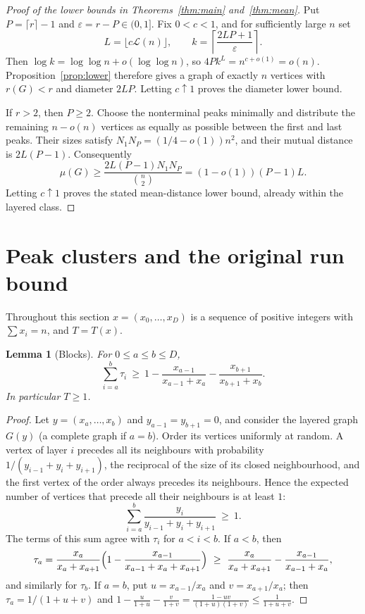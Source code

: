 \documentclass[11pt]{amsart}
\newtheorem{lemma}[theorem]{Lemma}
\theoremstyle{definition}
\theoremstyle{remark}
\newcommand{\Lz}{\mathcal{L}}
\begin{document}
\begin{proof}[Proof of the lower bounds in Theorems~\ref{thm:main} and~\ref{thm:mean}]
Put $P=\lceil r\rceil-1$ and $\varepsilon=r-P\in(0,1]$.
Fix $0<c<1$, and for sufficiently large $n$ set
\[
 L=\lfloor c\Lz(n)\rfloor,
 \qquad k=\left\lceil\frac{2LP+1}{\varepsilon}\right\rceil.
\]
Then $\log k=\log\log n+o(\log\log n)$, so
$4Pk^L=n^{c+o(1)}=o(n)$. Proposition~\ref{prop:lower} therefore gives a
graph of exactly $n$ vertices with $r(G)<r$ and diameter $2LP$.
Letting $c\uparrow1$ proves the diameter lower bound.

If $r>2$, then $P\ge2$. Choose the nonterminal peaks minimally and
distribute the remaining $n-o(n)$ vertices as equally as possible between
the first and last peaks. Their sizes satisfy
$N_1N_P=(1/4-o(1))n^2$, and their mutual distance is $2L(P-1)$.
Consequently
\[
 \mu(G)\ge\frac{2L(P-1)N_1N_P}{\binom n2}
          =(1-o(1))(P-1)L.
\]
Letting $c\uparrow1$ proves the stated mean-distance lower bound, already
within the layered class.
\end{proof}
\section{Peak clusters and the original run bound}\label{sec:clusters}

Throughout this section $x=(x_0,\dots,x_D)$ is a sequence of positive integers with $\sum x_i=n$, and $T=T(x)$.

\begin{lemma}[Blocks]\label{lem:block}
For $0\le a\le b\le D$,
\[
\sum_{i=a}^{b}\tau_i\ \ge\ 1-\frac{x_{a-1}}{x_{a-1}+x_a}-\frac{x_{b+1}}{x_{b+1}+x_b}.
\]
In particular $T\ge1$.
\end{lemma}

\begin{proof}
Let $y=(x_a,\dots,x_b)$ and $y_{a-1}=y_{b+1}=0$, and consider the layered graph $G(y)$ (a complete graph if $a=b$). Order its vertices uniformly at random. A vertex of layer $i$ precedes all its neighbours with probability $1/(y_{i-1}+y_i+y_{i+1})$, the reciprocal of the size of its closed neighbourhood, and the first vertex of the order always precedes its neighbours. Hence the expected number of vertices that precede all their neighbours is at least $1$:
\[
\sum_{i=a}^{b}\frac{y_i}{y_{i-1}+y_i+y_{i+1}}\ \ge\ 1 .
\]
The terms of this sum agree with $\tau_i$ for $a<i<b$.
If $a<b$, then
\[
\tau_a=\frac{x_a}{x_a+x_{a+1}}\Bigl(1-\frac{x_{a-1}}{x_{a-1}+x_a+x_{a+1}}\Bigr)\ \ge\ \frac{x_a}{x_a+x_{a+1}}-\frac{x_{a-1}}{x_{a-1}+x_a},
\]
and similarly for $\tau_b$.
If $a=b$, put $u=x_{a-1}/x_a$ and $v=x_{a+1}/x_a$; then $\tau_a=1/(1+u+v)$ and
$1-\frac u{1+u}-\frac v{1+v}=\frac{1-uv}{(1+u)(1+v)}\le\frac1{1+u+v}$.
\end{proof}
\end{document}
